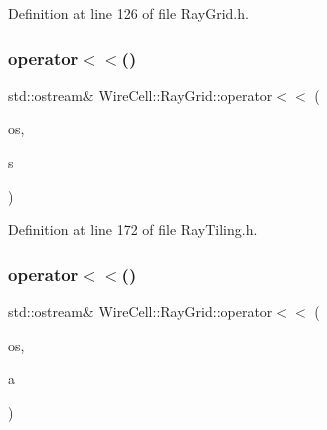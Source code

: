Definition at line 126 of file Ray\+Grid.\+h.

\mbox{\label{namespace_wire_cell_1_1_ray_grid_a48ccf389e7999daf1e79ba27c68b6752}} 
\subsubsection{\texorpdfstring{operator$<$$<$()}{operator<<()}\hspace{0.1cm}{\footnotesize\ttfamily [2/5]}}
{\footnotesize\ttfamily std\+::ostream\& Wire\+Cell\+::\+Ray\+Grid\+::operator$<$$<$ (\begin{DoxyParamCaption}\item[{std\+::ostream \&}]{os,  }\item[{const \hyperlink{struct_wire_cell_1_1_ray_grid_1_1_strip}{Wire\+Cell\+::\+Ray\+Grid\+::\+Strip} \&}]{s }\end{DoxyParamCaption})\hspace{0.3cm}{\ttfamily [inline]}}



Definition at line 172 of file Ray\+Tiling.\+h.

\mbox{\label{namespace_wire_cell_1_1_ray_grid_ab7bb8eba0ead6662043107193ad27361}} 
\subsubsection{\texorpdfstring{operator$<$$<$()}{operator<<()}\hspace{0.1cm}{\footnotesize\ttfamily [3/5]}}
{\footnotesize\ttfamily std\+::ostream\& Wire\+Cell\+::\+Ray\+Grid\+::operator$<$$<$ (\begin{DoxyParamCaption}\item[{std\+::ostream \&}]{os,  }\item[{const \hyperlink{class_wire_cell_1_1_ray_grid_1_1_activity}{Wire\+Cell\+::\+Ray\+Grid\+::\+Activity} \&}]{a }\end{DoxyParamCaption})\hspace{0.3cm}{\ttfamily [inline]}}



